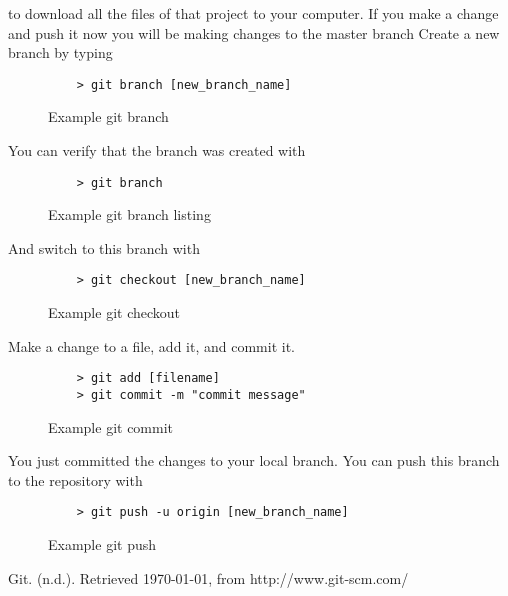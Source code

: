 \documentclass[11pt]{report}
\begin{document}
to download all the files of that project to your computer.  If you
make a change and push it now you will be making changes to the master
branch Create a new branch by typing

\begin{figure}[H]
  \caption{Example git branch}
  \begin{lstlisting}
    > git branch [new_branch_name]
  \end{lstlisting}
\end{figure}

You can verify that the branch was created with

\begin{figure}[H]
  \caption{Example git branch listing}
  \begin{lstlisting}
    > git branch
  \end{lstlisting}
\end{figure}

And switch to this branch with

\begin{figure}[H]
  \caption{Example git checkout}
  \begin{lstlisting}
    > git checkout [new_branch_name]
  \end{lstlisting}
\end{figure}

Make a change to a file, add it, and commit it.

\begin{figure}[H]
  \caption{Example git commit}
  \begin{lstlisting}
    > git add [filename]
    > git commit -m "commit message"
    \end{lstlisting}
\end{figure}

You just committed the changes to your local branch.  You can push
this branch to the repository with

\begin{figure}[H]
  \caption{Example git push}
  \begin{lstlisting}
    > git push -u origin [new_branch_name]
  \end{lstlisting}
\end{figure}

\begin{thebibliography}{9}

    Git. (n.d.). Retrieved \today, from http://www.git-scm.com/

\end{thebibliography}
\end{document}
